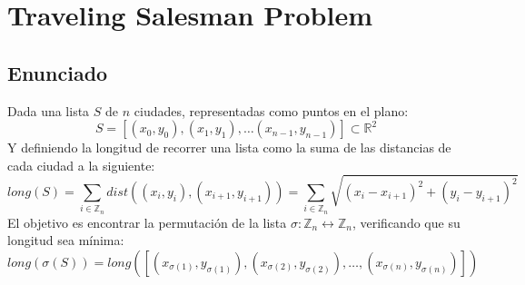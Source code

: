 \documentclass[a4paper, 11pt]{article} %
\begin{document}
\section{Traveling Salesman Problem}
  \subsection{Enunciado}
    Dada una lista $S$ de $n$ ciudades, representadas como puntos en el plano:
    \begin{equation}
      S = [(x_0,y_0), (x_1,y_1), \dots (x_{n-1},y_{n-1})] \subset \mathbb{R}^2
    \end{equation}
    Y definiendo la longitud de recorrer una lista como la suma de las distancias de cada ciudad a la siguiente:
    \begin{equation}
     long(S) = \sum_{i \in \mathbb{Z}_n} dist((x_i,y_i), (x_{i+1}, y_{i+1})) = \sum_{i \in \mathbb{Z}_n} \sqrt{(x_i-x_{i+1})^2 + (y_i-y_{i+1})^2}
    \end{equation}
    El objetivo es encontrar la permutación de la lista $\sigma : \mathbb{Z}_n \leftrightarrow \mathbb{Z}_n$, verificando que su longitud sea mínima:
    \begin{equation}
     long(\sigma(S)) = long([(x_{\sigma(1)},y_{\sigma(1)}), (x_{\sigma(2)},y_{\sigma(2)}), \dots, (x_{\sigma(n)},y_{\sigma(n)})])
    \end{equation}
    
\end{document}
